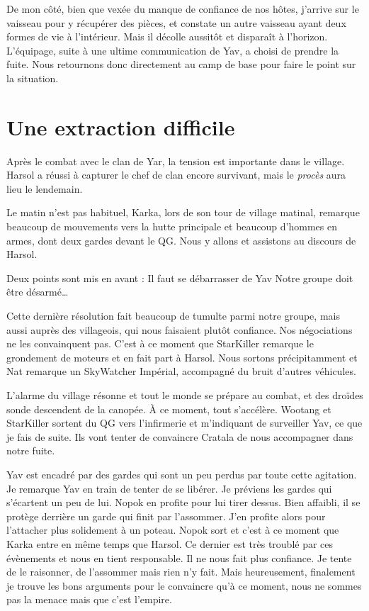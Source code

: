 \documentclass[a4paper,9pt,twoside,twocolumn,openany]{book}
\begin{document}
De mon côté, bien que vexée du manque de confiance de nos hôtes, j’arrive sur le vaisseau pour y récupérer des pièces, et constate un autre vaisseau ayant deux formes de vie à l’intérieur. Mais il décolle aussitôt et disparaît à l’horizon. L’équipage, suite à une ultime communication de Yav, a choisi de prendre la fuite. Nous retournons donc directement au camp de base pour faire le point sur la situation.

\section{Une extraction difficile}
\subtitle{8 janvier 2017}

Après le combat avec le clan de Yar, la tension est importante dans le village. Harsol a réussi à capturer le chef de clan encore survivant, mais le \emph{procès} aura lieu le lendemain.

Le matin n’est pas habituel, Karka, lors de son tour de village matinal, remarque beaucoup de mouvements vers la hutte principale et beaucoup d’hommes en armes, dont deux gardes devant le QG. Nous y allons et assistons au discours de Harsol.

Deux points sont mis en avant :
Il faut se débarrasser de Yav
Notre groupe doit être désarmé…

Cette dernière résolution fait beaucoup de tumulte parmi notre groupe, mais aussi auprès des villageois, qui nous faisaient plutôt confiance. Nos négociations ne les convainquent pas. C’est à ce moment que StarKiller remarque le grondement de moteurs et en fait part à Harsol. Nous sortons précipitamment et Nat remarque un SkyWatcher Impérial, accompagné du bruit d’autres véhicules.

L’alarme du village résonne et tout le monde se prépare au combat, et des droïdes sonde descendent de la canopée. À ce moment, tout s’accélère. Wootang et StarKiller sortent du QG vers l’infirmerie et m’indiquant de surveiller Yav, ce que je fais de suite. Ils vont tenter de convaincre Cratala de nous accompagner dans notre fuite.

Yav est encadré par des gardes qui sont un peu perdus par toute cette agitation. Je remarque Yav en train de tenter de se libérer. Je préviens les gardes qui s’écartent un peu de lui. Nopok en profite pour lui tirer dessus. Bien affaibli, il se protège derrière un garde qui finit par l’assommer. J’en profite alors pour l’attacher plus solidement à un poteau. Nopok sort et c’est à ce moment que Karka entre en même temps que Harsol. Ce dernier est très troublé par ces évènements et nous en tient responsable. Il ne nous fait plus confiance. Je tente de le raisonner, de l’assommer mais rien n’y fait. Mais heureusement, finalement je trouve les bons arguments pour le convaincre qu’à ce moment, nous ne sommes pas la menace mais que c’est l’empire.
\end{document}
